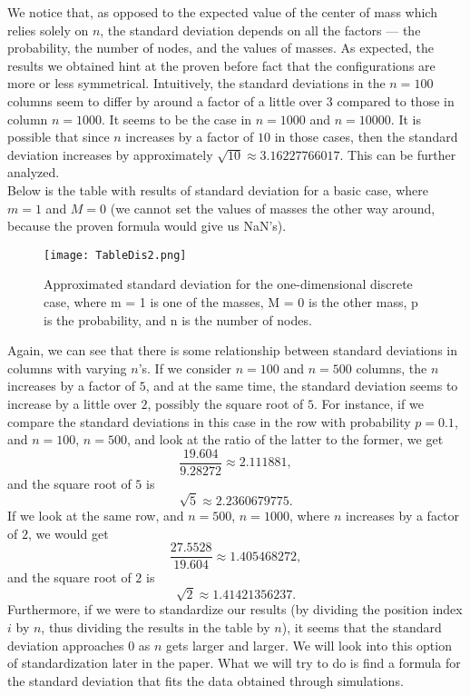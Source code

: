 \documentclass[11pt, twoside, reqno]{book}
\begin{document}
We notice that, as opposed to the expected value of the center of mass which relies solely on $n$, the standard deviation depends on all the factors --- the probability, the number of nodes, and the values of masses. As expected, the results we obtained hint at the proven before fact that the configurations are more or less symmetrical. Intuitively, the standard deviations in the $n = 100$ columns seem to differ by around a factor of a little over $3$ compared to those in column $n = 1000$. It seems to be the case in $n=1000$ and $n=10000$. It is possible that since $n$ increases by a factor of $10$ in those cases, then the standard deviation increases by approximately $\sqrt{10} \approx 3.16227766017$. This can be further analyzed.\\
Below is the table with results of standard deviation for a basic case, where $m = 1$ and $M=0$ (we cannot set the values of masses the other way around, because the proven formula would give us NaN's). 

\begin{figure}[ht]
\centering
\texttt{[image: TableDis2.png]}
\caption{Approximated standard deviation for the one-dimensional discrete case, where m = 1 is one of the masses, M = 0 is the other mass, p is the probability, and n is the number of nodes.}
\label{TableDis}
\end{figure}
Again, we can see that there is some relationship between standard deviations in columns with varying $n$'s. If we consider $n = 100$ and $n=500$ columns, the $n$ increases by a factor of $5$, and at the same time, the standard deviation seems to increase by a little over $2$, possibly the square root of $5$. For instance, if we compare the standard deviations in this case in the row with probability $p=0.1$, and $n=100$, $n=500$, and look at the ratio of the latter to the former, we get
$$\frac{19.604}{9.28272}\approx 2.111881,$$
and the square root of $5$ is
$$\sqrt{5} \approx 2.2360679775.$$
If we look at the same row, and $n=500$, $n=1000$, where $n$ increases by a factor of $2$, we would get
$$\frac{27.5528}{19.604} \approx 1.405468272,$$
and the square root of $2$ is
$$\sqrt{2} \approx 1.41421356237.$$
Furthermore, if we were to standardize our results (by dividing the position index $i$ by $n$, thus dividing the results in the table by $n$), it seems that the standard deviation approaches $0$ as $n$ gets larger and larger. We will look into this option of standardization later in the paper. What we will try to do is find a formula for the standard deviation that fits the data obtained through simulations.
\end{document}
